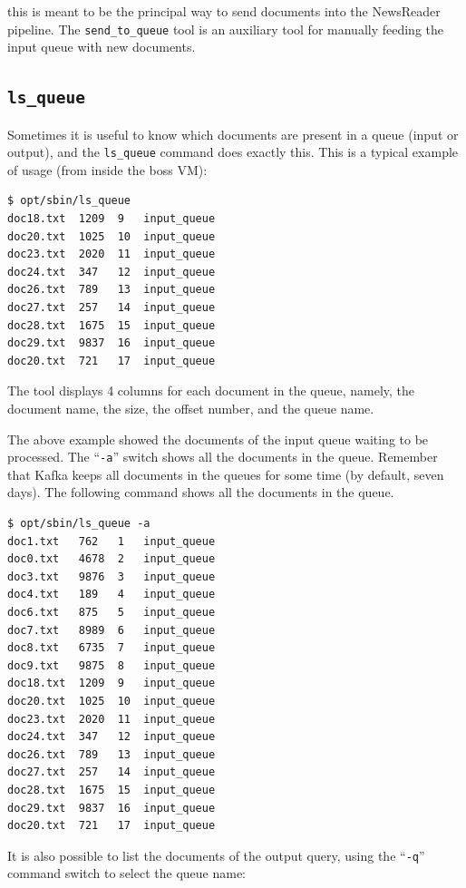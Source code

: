 \documentclass[a4]{article}
\newcommand{\todo}[1]{\textcolor{red}{\noindent$\rightarrow$ TODO: #1}}
\begin{document}

\noindent this is meant to be the principal way to send documents into the
NewsReader pipeline. The \texttt{send\_to\_queue} tool is an auxiliary tool
for manually feeding the input queue with new documents.

\subsection*{\texttt{ls\_queue}}
\label{sec:ls_queue}

Sometimes it is useful to know which documents are present in a queue (input
or output), and the \texttt{ls\_queue} command does exactly this. This is a
typical example of usage (from inside the \textrm{boss} VM):

\begin{verbatim}
$ opt/sbin/ls_queue
doc18.txt  1209  9   input_queue
doc20.txt  1025  10  input_queue
doc23.txt  2020  11  input_queue
doc24.txt  347   12  input_queue
doc26.txt  789   13  input_queue
doc27.txt  257   14  input_queue
doc28.txt  1675  15  input_queue
doc29.txt  9837  16  input_queue
doc20.txt  721   17  input_queue
\end{verbatim}

The tool displays 4 columns for each document in the queue, namely, the
document name, the size, the offset number, and the queue name.

The above example showed the documents of the input queue waiting to be
processed. The ``\texttt{-a}'' switch shows all the documents in the
queue. Remember that Kafka keeps all documents in the queues for some time
(by default, seven days). The following command shows all the documents in
the queue.

\begin{verbatim}
$ opt/sbin/ls_queue -a
doc1.txt   762   1   input_queue
doc0.txt   4678  2   input_queue
doc3.txt   9876  3   input_queue
doc4.txt   189   4   input_queue
doc6.txt   875   5   input_queue
doc7.txt   8989  6   input_queue
doc8.txt   6735  7   input_queue
doc9.txt   9875  8   input_queue
doc18.txt  1209  9   input_queue
doc20.txt  1025  10  input_queue
doc23.txt  2020  11  input_queue
doc24.txt  347   12  input_queue
doc26.txt  789   13  input_queue
doc27.txt  257   14  input_queue
doc28.txt  1675  15  input_queue
doc29.txt  9837  16  input_queue
doc20.txt  721   17  input_queue
\end{verbatim}

It is also possible to list the documents of the output query, using the
``\texttt{-q}'' command switch to select the queue name:
\end{document}
